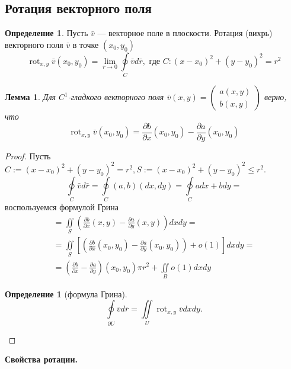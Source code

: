 \documentclass[a5paper]{article}
\newcounter{through}
\theoremstyle{plain}
\newtheorem{lemma}[through]{Лемма}
\theoremstyle{definition}
\newtheorem{definition}[through]{Определение}
\numberwithin{through}{section}
\numberwithin{equation}{section}
\DeclareMathOperator{\rot}{rot}
\begin{document}

\subsection{Ротация векторного поля}
\begin{definition}
	Пусть $\bar{v}$ --- векторное поле в плоскости. 
	Ротация (вихрь) векторного поля $\bar{v}$ в точке $(x_0, y_0)$ 
	\[\rot_{x, y} \bar{v} (x_0, y_0) = 
	\lim\limits_{r \to 0} \oint\limits_{C} \bar{v}d\bar{r}, \text{ где } C: (x-x_0)^2 + (y - y_0)^2 = r^2 \]
\end{definition}
\begin{lemma}
	Для $C^1$-гладкого векторного поля $\bar{v}(x,y) = 
	\begin{pmatrix}
	a(x,y) \\
	b(x,y)
	\end{pmatrix}$ верно, что 
	\[ \rot_{x, y} \bar{v}(x_0, y_0) = \frac{\partial b}{\partial x}(x_0, y_0) - \frac{\partial a}{\partial y}(x_0, y_0) \]
\end{lemma}
\begin{proof}
	Пусть $C := (x-x_0)^2 + (y - y_0)^2 = r^2, S:=(x-x_0)^2 + (y - y_0)^2 \leq r^2 $. 
	\begin{equation*}
	\oint\limits_C \bar{v}d\bar{r} = \oint\limits_C (a, b)(dx, dy) = \oint\limits_C adx + bdy = 
	\end{equation*}
	воспользуемся формулой Грина
	\begin{eqnarray}
	= \iint\limits_S \left( \frac{\partial b}{\partial x}(x, y) - \frac{\partial a}{\partial y}(x, y) \right)dxdy = \nonumber\\
	= \iint\limits_S \left[ \left( \frac{\partial b}{\partial x}(x_0, y_0) - \frac{\partial a}{\partial y}(x_0, y_0) \right) + o(1) \right]
	dxdy = \nonumber \\
	= \left( \frac{\partial b}{\partial x} - \frac{\partial a}{\partial y} \right)(x_0, y_0) \pi r^2 + \iint\limits_B o(1)dxdy
	\nonumber
	\end{eqnarray}  
	
	\begin{definition}[формула Грина]
		\begin{equation*}
		\oint\limits_{\partial U} \bar{v} d\bar{r} = \iint\limits_U \rot_{x,y} \bar{v} dxdy.
		\end{equation*}
	\end{definition}
\end{proof}

{\bf Свойства ротации.}
\end{document}
